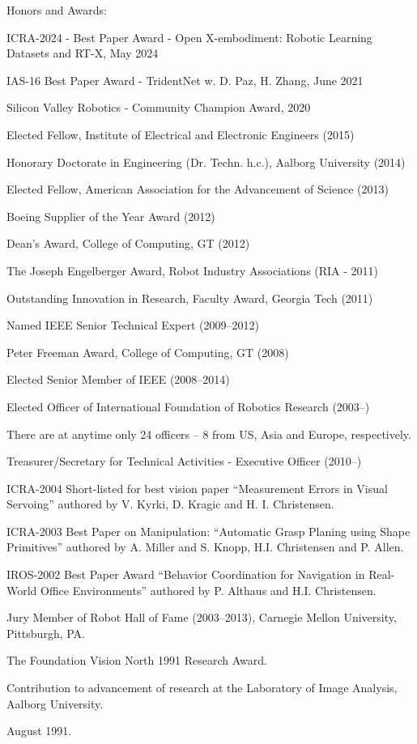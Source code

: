 \documentclass{article}
\newenvironment{sublist}{%
  \begin{list}{}{%
      \setlength{\itemsep}{0em}\setlength{\parsep}{0em}%
      \setlength{\topsep}{0em}\setlength{\parskip}{0em}%
    }%
}%
{ \end{list} }
\begin{document}
\begin{cv}
\begin{cvlist}{Honors and Awards:}
\item ICRA-2024 - Best Paper Award - Open X-embodiment: Robotic Learning Datasets and RT-X, May 2024
\item IAS-16 Best Paper Award - TridentNet w. D. Paz, H. Zhang, June 2021
\item Silicon Valley Robotics - Community Champion Award, 2020
\item Elected Fellow, Institute of Electrical and Electronic Engineers (2015)
\item Honorary Doctorate in Engineering (Dr. Techn. h.c.), Aalborg University (2014)
\item Elected Fellow, American Association for the Advancement of Science (2013)
\item Boeing Supplier of the Year Award (2012)
\item Dean's Award, College of Computing, GT (2012)
\item The Joseph Engelberger Award, Robot Industry Associations (RIA - 2011)
\item Outstanding Innovation in Research, Faculty Award, Georgia Tech (2011)
\item Named IEEE Senior Technical Expert (2009--2012)
\item Peter Freeman Award, College of Computing, GT (2008)
\item Elected Senior Member of IEEE (2008--2014)
\item Elected Officer of International Foundation of Robotics Research
  (2003--)
  \begin{sublist}
  \item There are at anytime only 24 officers -- 8 from US, Asia and Europe,
    respectively.
  \item Treasurer/Secretary for Technical Activities - Executive
    Officer (2010--)
  \end{sublist}
\item ICRA-2004 Short-listed for best vision paper ``Measurement
  Errors in Visual Servoing'' authored by V. Kyrki, D. Kragic and H.
  I. Christensen.
\item ICRA-2003 Best Paper on Manipulation:  ``Automatic
  Grasp Planing using Shape Primitives'' authored by A. Miller and
  S. Knopp, H.I. Christensen and P. Allen.
\item IROS-2002 Best Paper Award ``Behavior Coordination for
  Navigation in Real-World Office Environments'' authored by
  P. Althaus and H.I. Christensen.
\item Jury Member of Robot Hall of Fame (2003--2013), Carnegie Mellon
  University, Pittsburgh, PA.
\item The Foundation Vision North 1991 Research Award.
  \begin{sublist}
  \item Contribution to advancement of research at the Laboratory of
    Image Analysis, Aalborg University.
  \item August 1991.
  \end{sublist}
\end{cvlist}
\end{cv}
\end{document}
